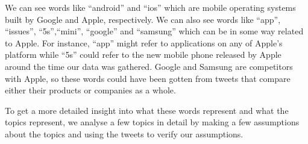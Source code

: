 We can see words like ``android'' and ``ios'' which are mobile operating systems built by Google and
Apple, respectively. We can also see words like ``app'', ``issues'', ``5s'',``mini'', ``google'' and
``samsung'' which can be in some way related to Apple. For instance, ``app'' might refer to
applications on any of Apple's platform while ``5s'' could refer to the new mobile phone released by
Apple around the time our data was gathered. Google and Samsung are competitors with Apple, so these
words could have been gotten from tweets that compare either their products or companies as a
whole.

To get a more detailed insight into what these words represent and what the topics represent, we
analyse a few topics in detail by making a few assumptions about the topics and using the tweets to
verify our assumptions.\\


